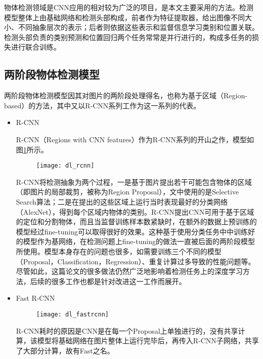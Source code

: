 物体检测领域是CNN应用的相对较为广泛的项目，是本文主要采用的方法。检测模型整体上由基础网络和检测头部构成，前者作为特征提取器，给出图像不同大小、不同抽象层次的表示；后者则依据这些表示和监督信息学习类别和位置关联。检测头部负责的类别预测和位置回归两个任务常常是并行进行的，构成多任务的损失进行联合训练。

\subsection{两阶段物体检测模型}
两阶段物体检测模型因其对图片的两阶段处理得名，也称为基于区域（Region-based）的方法，其中又以R-CNN系列工作为这一系列的代表。
\begin{itemize}
	\item R-CNN\cite{40girshick2014rich}
	
	R-CNN（Regions with CNN features）作为R-CNN系列的开山之作，模型如图\ref{fig:dl_rcnn}所示。
	
	\begin{figure}[!htbp]
    \centering
    \texttt{[image: dl\_rcnn]}
    \label{fig:dl_rcnn}
	\end{figure}

R-CNN将检测抽象为两个过程，一是基于图片提出若干可能包含物体的区域（即图片的局部裁剪，被称为Region Proposal），文中使用的是Selective Search算法\cite{uijlings2013selective}；二是在提出的这些区域上运行当时表现最好的分类网络（AlexNet）\cite{19krizhevsky2012imagenet}，得到每个区域内物体的类别。R-CNN提出CNN可用于基于区域的定位和分割物体，而且当监督训练样本数紧缺时，在额外的数据上预训练的模型经过fine-tuning可以取得很好的效果。这种基于使用分类任务中中训练好的模型作为基网络，在检测问题上fine-tuning的做法一直被后面的两阶段模型所使用。模型本身存在的问题也很多，如需要训练三个不同的模型（Proposal，Classification，Regression）、重复计算过多导致的性能问题等。尽管如此，这篇论文的很多做法仍然广泛地影响着检测任务上的深度学习方法，后续的很多工作也都是针对改进这一工作而展开。

	\item Fast R-CNN\cite{41girshick2015fast}
	
	\begin{figure}[!htbp]
    \centering
    \texttt{[image: dl\_fastrcnn]}
    \label{fig:dl_fastrcnn}
	\end{figure}
	R-CNN耗时的原因是CNN是在每一个Proposal上单独进行的，没有共享计算，该模型将基础网络在图片整体上运行完毕后，再传入R-CNN子网络，共享了大部分计算，故有Fast之名。
	

\end{itemize}
